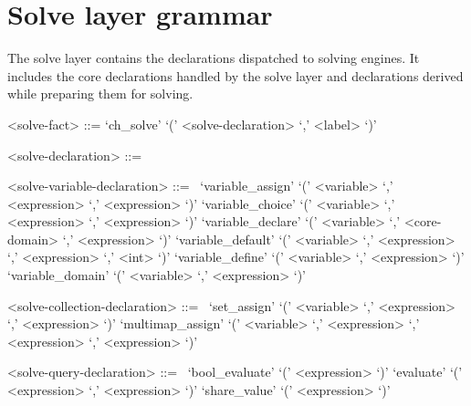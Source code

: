 \section{Solve layer grammar}

The solve layer contains the declarations dispatched to solving engines.  It
includes the core declarations handled by the solve layer and declarations
derived while preparing them for solving.

\begin{grammar}
<solve-fact> ::= `ch_solve' `(' <solve-declaration> `,' <label> `)'

<solve-declaration> ::=
~

<solve-variable-declaration> ::=
~\alt `variable_assign' `(' <variable> `,' <expression> `,' <expression> `)'
\alt `variable_choice' `(' <variable> `,' <expression> `,' <expression> `)'
\alt `variable_declare' `(' <variable> `,' <core-domain> `,' <expression> `)'
\alt `variable_default' `(' <variable> `,' <expression> `,' <expression> `,' <int> `)'
\alt `variable_define' `(' <variable> `,' <expression> `)'
\alt `variable_domain' `(' <variable> `,' <expression> `)'

<solve-collection-declaration> ::=
~\alt `set_assign' `(' <variable> `,' <expression> `,' <expression> `)'
\alt `multimap_assign' `(' <variable> `,' <expression> `,' <expression> `,' <expression> `)'

<solve-query-declaration> ::=
~\alt `bool_evaluate' `(' <expression> `)'
\alt `evaluate' `(' <expression> `,' <expression> `)'
\alt `share_value' `(' <expression> `)'
\end{grammar}

